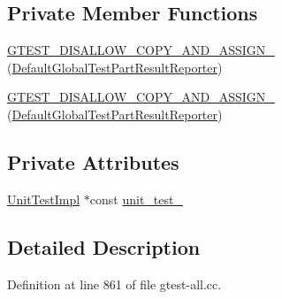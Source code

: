 \subsection*{\-Private \-Member \-Functions}
\begin{DoxyCompactItemize}
\item 
\hyperlink{classtesting_1_1internal_1_1DefaultGlobalTestPartResultReporter_ad07b9894581e4324500bf725f740e349}{\-G\-T\-E\-S\-T\-\_\-\-D\-I\-S\-A\-L\-L\-O\-W\-\_\-\-C\-O\-P\-Y\-\_\-\-A\-N\-D\-\_\-\-A\-S\-S\-I\-G\-N\-\_\-} (\hyperlink{classtesting_1_1internal_1_1DefaultGlobalTestPartResultReporter}{\-Default\-Global\-Test\-Part\-Result\-Reporter})
\item 
\hyperlink{classtesting_1_1internal_1_1DefaultGlobalTestPartResultReporter_ad07b9894581e4324500bf725f740e349}{\-G\-T\-E\-S\-T\-\_\-\-D\-I\-S\-A\-L\-L\-O\-W\-\_\-\-C\-O\-P\-Y\-\_\-\-A\-N\-D\-\_\-\-A\-S\-S\-I\-G\-N\-\_\-} (\hyperlink{classtesting_1_1internal_1_1DefaultGlobalTestPartResultReporter}{\-Default\-Global\-Test\-Part\-Result\-Reporter})
\end{DoxyCompactItemize}
\subsection*{\-Private \-Attributes}
\begin{DoxyCompactItemize}
\item 
\hyperlink{classtesting_1_1internal_1_1UnitTestImpl}{\-Unit\-Test\-Impl} $\ast$const \hyperlink{classtesting_1_1internal_1_1DefaultGlobalTestPartResultReporter_a82c5334452afe614170bbc7ee736969c}{unit\-\_\-test\-\_\-}
\end{DoxyCompactItemize}


\subsection{\-Detailed \-Description}


\-Definition at line 861 of file gtest-\/all.\-cc.



